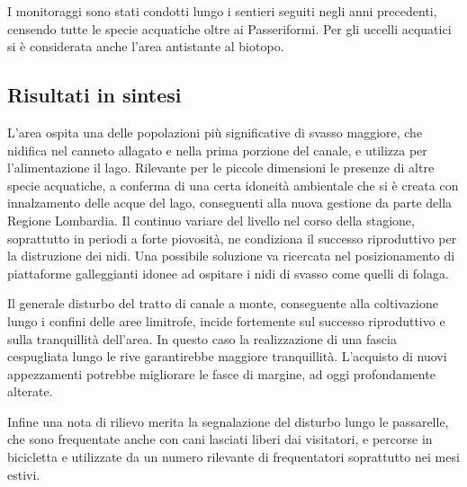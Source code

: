 \documentclass[11pt,a4paper,twoside]{memoir}
\begin{document}
 I monitoraggi sono stati condotti lungo i sentieri seguiti negli anni precedenti, censendo tutte le specie acquatiche oltre ai Passeriformi. Per gli uccelli acquatici si è considerata anche l’area antistante al biotopo.

 \subsection{Risultati in sintesi}

 L’area ospita una delle popolazioni più significative di svasso maggiore, che nidifica nel canneto allagato e nella prima porzione del canale, e utilizza per l’alimentazione il lago. Rilevante per le piccole dimensioni le presenze di altre specie acquatiche, a conferma di una certa idoneità ambientale che si è creata con innalzamento delle acque del lago, conseguenti alla nuova gestione da parte della Regione Lombardia. Il continuo variare del livello nel corso della stagione, soprattutto in periodi a forte piovosità, ne condiziona il successo riproduttivo per la distruzione dei nidi. Una possibile soluzione va ricercata nel posizionamento di piattaforme galleggianti idonee ad ospitare i nidi di svasso come quelli di folaga.

Il generale disturbo del tratto di canale a monte, conseguente alla coltivazione lungo i confini delle aree limitrofe, incide fortemente sul successo riproduttivo e sulla tranquillità dell’area. In questo caso la realizzazione di una fascia cespugliata lungo le rive garantirebbe maggiore tranquillità. L’acquisto di nuovi appezzamenti potrebbe migliorare le fasce di margine, ad oggi profondamente alterate. 

Infine una nota di rilievo merita la segnalazione del disturbo lungo le passarelle, che sono frequentate anche con cani lasciati liberi dai visitatori, e percorse in bicicletta e utilizzate da un numero rilevante di frequentatori soprattutto nei mesi estivi.
\end{document}
